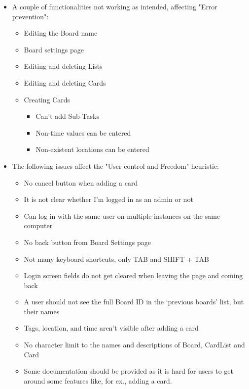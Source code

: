 \begin{itemize}
    \item A couple of functionalities not working as intended, affecting "Error prevention":
    \begin{itemize}
        \item Editing the Board name
        \item Board settings page
        \item Editing and deleting Lists
        \item Editing and deleting Cards
        \item Creating Cards
        \begin{itemize}
            \item Can’t add Sub-Tasks
            \item Non-time values can be entered
            \item Non-existent locations can be entered
        \end{itemize}
    \end{itemize}
    
    \item The following issues affect the "User control and Freedom" heuristic:
    \begin{itemize}
        \item No cancel button when adding a card
        \item It is not clear whether I’m logged in as an admin or not
        \item Can log in with the same user on multiple instances on the same computer
        \item No back button from Board Settings page
        \item Not many keyboard shortcuts, only TAB and SHIFT + TAB
        \item Login screen fields do not get cleared when leaving the page and coming back
        \item A user should not see the full Board ID in the ‘previous boards’ list, but their names
        \item Tags, location, and time aren't visible after adding a card
        \item No character limit to the names and descriptions of Board, CardList and Card
        \item Some documentation should be provided as it is hard for users to get around some features like, for ex., adding a card.
    \end{itemize}
\end{itemize}

